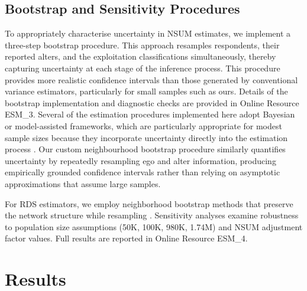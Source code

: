 \documentclass[
  12pt,
  letterpaper,
  DIV=11,
  numbers=noendperiod]{scrartcl}
\begin{document}
\subsection{Bootstrap and Sensitivity Procedures}\label{sec-bootstrap}

To appropriately characterise uncertainty in NSUM estimates, we
implement a three-step bootstrap procedure. This approach resamples
respondents, their reported alters, and the exploitation classifications
simultaneously, thereby capturing uncertainty at each stage of the
inference process. This procedure provides more realistic confidence
intervals than those generated by conventional variance estimators,
particularly for small samples such as ours. Details of the bootstrap
implementation and diagnostic checks are provided in Online Resource
ESM\_3. Several of the estimation procedures implemented here adopt
Bayesian or model-assisted frameworks, which are particularly
appropriate for modest sample sizes because they incorporate uncertainty
directly into the estimation process \autocite{gile18-methods}. Our
custom neighbourhood bootstrap procedure similarly quantifies
uncertainty by repeatedly resampling ego and alter information,
producing empirically grounded confidence intervals rather than relying
on asymptotic approximations that assume large samples.

For RDS estimators, we employ neighborhood bootstrap methods that
preserve the network structure while resampling
\autocite{yauc22-neighborhood}. Sensitivity analyses examine robustness
to population size assumptions (50K, 100K, 980K, 1.74M) and NSUM
adjustment factor values. Full results are reported in Online Resource
ESM\_4.

\section{Results}\label{sec-results}
\end{document}
